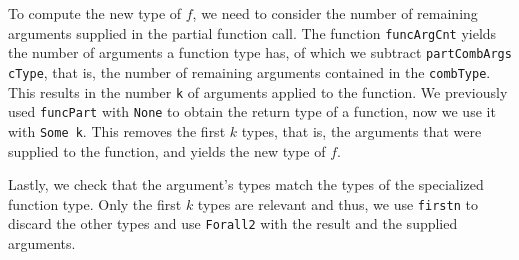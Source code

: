 \documentclass[paper = a4, fleqn, twoside]{scrreprt}
\newcommand{\coqinline}[1]{\texttt{#1}}
\begin{document}
\par
To compute the new type of $f$, we need to consider the number of remaining arguments supplied in the partial function call. The function \coqinline{funcArgCnt} yields the number of arguments a function type has, of which we subtract \texttt{partCombArgs cType}, that is, the number of remaining arguments contained in the \texttt{combType}. This results in the number \texttt{k} of arguments applied to the function. We previously used \coqinline{funcPart} with \coqinline{None} to obtain the return type of a function, now we use it with \coqinline{Some k}. This removes the first $k$ types, that is, the arguments that were supplied to the function, and yields the new type of $f$.
\par
Lastly, we check that the argument's types match the types of the specialized function type. Only the first $k$ types are relevant and thus, we use \coqinline{firstn} to discard the other types and use \coqinline{Forall2} with the result and the supplied arguments.
\end{document}
